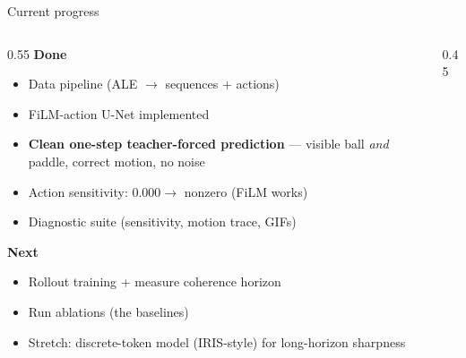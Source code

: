 \documentclass[aspectratio=169]{beamer}
\newcommand{\good}[1]{\textcolor{cGood}{#1}}
\begin{document}
\begin{frame}{Current progress}
  \begin{columns}
    \begin{column}{0.55\textwidth}
      \textbf{Done}
      \begin{itemize}
        \item[\good{\checkmark}] Data pipeline (ALE $\to$ sequences + actions)
        \item[\good{\checkmark}] FiLM-action U-Net implemented
        \item[\good{\checkmark}] \textbf{Clean one-step teacher-forced prediction} ---
              visible ball \emph{and} paddle, correct motion, no noise
        \item[\good{\checkmark}] Action sensitivity: $0.000 \to$ nonzero (FiLM works)
        \item[\good{\checkmark}] Diagnostic suite (sensitivity, motion trace, GIFs)
      \end{itemize}

      \textbf{Next}
      \begin{itemize}
        \item[$\rightarrow$] Rollout training + measure coherence horizon
        \item[$\rightarrow$] Run ablations (the baselines)
        \item[$\rightarrow$] Stretch: discrete-token model (IRIS-style) for
              long-horizon sharpness
      \end{itemize}
    \end{column}
    \begin{column}{0.45\textwidth}
      \centering
      \footnotesize
    \end{column}
  \end{columns}
\end{frame}
\end{document}
